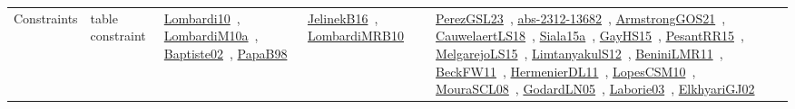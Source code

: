 {\begin{longtable}{lp{3cm}>{\raggedright\arraybackslash}p{6cm}>{\raggedright\arraybackslash}p{6cm}>{\raggedright\arraybackslash}p{8cm}}
Constraints & table constraint & \href{works/Lombardi10.pdf}{Lombardi10}~\cite{Lombardi10}, \href{works/LombardiM10a.pdf}{LombardiM10a}~\cite{LombardiM10a}, \href{works/Baptiste02.pdf}{Baptiste02}~\cite{Baptiste02}, \href{works/PapaB98.pdf}{PapaB98}~\cite{PapaB98} & \href{works/JelinekB16.pdf}{JelinekB16}~\cite{JelinekB16}, \href{works/LombardiMRB10.pdf}{LombardiMRB10}~\cite{LombardiMRB10} & \href{works/PerezGSL23.pdf}{PerezGSL23}~\cite{PerezGSL23}, \href{works/abs-2312-13682.pdf}{abs-2312-13682}~\cite{abs-2312-13682}, \href{works/ArmstrongGOS21.pdf}{ArmstrongGOS21}~\cite{ArmstrongGOS21}, \href{works/CauwelaertLS18.pdf}{CauwelaertLS18}~\cite{CauwelaertLS18}, \href{works/Siala15a.pdf}{Siala15a}~\cite{Siala15a}, \href{works/GayHS15.pdf}{GayHS15}~\cite{GayHS15}, \href{works/PesantRR15.pdf}{PesantRR15}~\cite{PesantRR15}, \href{works/MelgarejoLS15.pdf}{MelgarejoLS15}~\cite{MelgarejoLS15}, \href{works/LimtanyakulS12.pdf}{LimtanyakulS12}~\cite{LimtanyakulS12}, \href{works/BeniniLMR11.pdf}{BeniniLMR11}~\cite{BeniniLMR11}, \href{works/BeckFW11.pdf}{BeckFW11}~\cite{BeckFW11}, \href{works/HermenierDL11.pdf}{HermenierDL11}~\cite{HermenierDL11}, \href{works/LopesCSM10.pdf}{LopesCSM10}~\cite{LopesCSM10}, \href{works/MouraSCL08.pdf}{MouraSCL08}~\cite{MouraSCL08}, \href{works/GodardLN05.pdf}{GodardLN05}~\cite{GodardLN05}, \href{works/Laborie03.pdf}{Laborie03}~\cite{Laborie03}, \href{works/ElkhyariGJ02.pdf}{ElkhyariGJ02}~\cite{ElkhyariGJ02}\\
\end{longtable}
}

